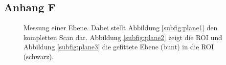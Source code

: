 \documentclass[	12pt,
				a4paper,
				bibliography=totoc,
				listof=totoc,
				index=totoc,
				twoside,
				headsepline,
				footsepline,
				ngerman]{scrartcl}
\begin{document}
\begin{appendix}
		\subsection{Anhang F}\label{anhang-f}
	
		\begin{figure}[h]
			\centering
			\caption[Messung einer Ebene]{Messung einer Ebene. Dabei stellt Abbildung \ref{subfig:plane1} den kompletten Scan dar. Abbildung \ref{subfig:plane2} zeigt die ROI und Abbildung \ref{subfig:plane3} die gefittete Ebene (bunt) in die ROI (schwarz).}
			\label{fig:plane_fit}
		\end{figure}
		

\end{appendix}
\end{document}

